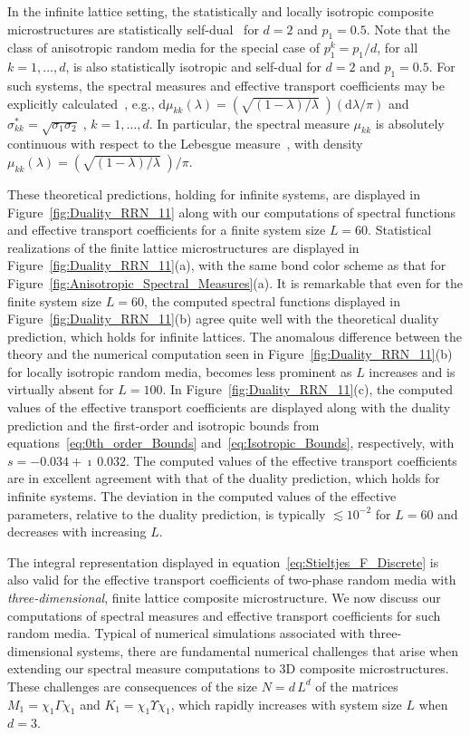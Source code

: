 \documentclass{cmslatex}
\renewcommand{\d}{\text{d}}
\begin{document}
In the infinite lattice setting, the statistically and locally
isotropic composite microstructures are statistically
self-dual~\cite{MILTON:2002:TC} for $d=2$ and $p_1=0.5$. Note that the
class of anisotropic random media for the special case of $p_1^k=p_1/d$, for all
$k=1,\ldots,d$, is also statistically isotropic and self-dual for  $d=2$ and
$p_1=0.5$. For such systems, the spectral measures and 
effective transport coefficients may be explicitly
calculated~\cite{MILTON:2002:TC}, 
e.g., $\d\mu_{kk}(\lambda)=(\sqrt{(1-\lambda)/\lambda}\;)(\d\lambda/\pi)$ and  
$\sigma^*_{kk}=\sqrt{\sigma_1\sigma_2}\;$, $k=1,\ldots,d$. In particular, the spectral
measure $\mu_{kk}$ is absolutely continuous with respect to the Lebesgue
measure~\cite{Folland:99}, with density $\mu_{kk}(\lambda)=(\sqrt{(1-\lambda)/\lambda}\;)/\pi$. 




These theoretical predictions, holding for
infinite systems, are displayed in Figure~\ref{fig:Duality_RRN_11}
along with our computations of spectral functions and effective
transport coefficients for a finite system size $L=60$. Statistical 
realizations of the finite lattice microstructures 
are displayed in Figure~\ref{fig:Duality_RRN_11}(a), with the same
bond color scheme as that for
Figure~\ref{fig:Anisotropic_Spectral_Measures}(a). It is remarkable
that even for the finite system size $L=60$, the computed spectral functions
displayed in Figure~\ref{fig:Duality_RRN_11}(b) agree quite well with
the theoretical duality prediction, which holds for infinite lattices. The  
anomalous difference between the theory and the numerical computation
seen in Figure~\ref{fig:Duality_RRN_11}(b) for locally isotropic
random media, becomes less prominent as $L$ increases and is virtually
absent for $L=100$. In Figure~\ref{fig:Duality_RRN_11}(c), 
the computed values of the effective 
transport coefficients are displayed along with the
duality prediction and the first-order
and isotropic bounds from equations~\eqref{eq:0th_order_Bounds}
and~\eqref{eq:Isotropic_Bounds}, respectively, with 
$s=-0.034+\imath\,0.032$. The computed values of the effective
transport coefficients are in excellent agreement with that of the
duality prediction, which holds for infinite systems. The
deviation in the computed values of the effective parameters, relative
to the duality prediction, is typically $\lesssim10^{-2}$ for $L=60$
and decreases with increasing $L$.




The integral representation displayed in
equation~\eqref{eq:Stieltjes_F_Discrete} is also valid for the
effective transport coefficients of two-phase random media with
\emph{three-dimensional}, finite lattice composite microstructure. We
now discuss our computations of spectral measures and effective
transport coefficients for such random media. Typical of numerical
simulations associated with three-dimensional systems, there are
fundamental numerical challenges that arise when extending our
spectral measure computations to 3D composite microstructures. These
challenges are consequences of the size $N=d\,L^d$ of the matrices
$M_1=\chi_1\Gamma\chi_1$ and $K_1=\chi_1\Upsilon\chi_1$, which rapidly increases
with system size $L$ when $d=3$.
\end{document}
